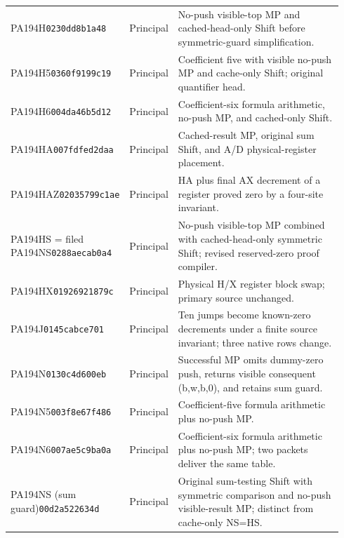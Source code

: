 {\begin{longtable}{@{}p{0.23\linewidth}p{0.13\linewidth}p{0.58\linewidth}@{}}
PA194H\newline\texttt{0230dd8b1a48} & Principal & No-push visible-top MP and cached-head-only Shift before symmetric-guard simplification.\\[2.5pt]
PA194H5\newline\texttt{0360f9199c19} & Principal & Coefficient five with visible no-push MP and cache-only Shift; original quantifier head.\\[2.5pt]
PA194H6\newline\texttt{004da46b5d12} & Principal & Coefficient-six formula arithmetic, no-push MP, and cached-only Shift.\\[2.5pt]
PA194HA\newline\texttt{007fdfed2daa} & Principal & Cached-result MP, original sum Shift, and A/D physical-register placement.\\[2.5pt]
PA194HAZ\newline\texttt{02035799c1ae} & Principal & HA plus final AX decrement of a register proved zero by a four-site invariant.\\[2.5pt]
PA194HS = filed PA194NS\newline\texttt{0288aecab0a4} & Principal & No-push visible-top MP combined with cached-head-only symmetric Shift; revised reserved-zero proof compiler.\\[2.5pt]
PA194HX\newline\texttt{01926921879c} & Principal & Physical H/X register block swap; primary source unchanged.\\[2.5pt]
PA194J\newline\texttt{0145cabce701} & Principal & Ten jumps become known-zero decrements under a finite source invariant; three native rows change.\\[2.5pt]
PA194N\newline\texttt{0130c4d600eb} & Principal & Successful MP omits dummy-zero push, returns visible consequent (b,w,b,0), and retains sum guard.\\[2.5pt]
PA194N5\newline\texttt{003f8e67f486} & Principal & Coefficient-five formula arithmetic plus no-push MP.\\[2.5pt]
PA194N6\newline\texttt{007ae5c9ba0a} & Principal & Coefficient-six formula arithmetic plus no-push MP; two packets deliver the same table.\\[2.5pt]
PA194NS (sum guard)\newline\texttt{00d2a522634d} & Principal & Original sum-testing Shift with symmetric comparison and no-push visible-result MP; distinct from cache-only NS=HS.\\[2.5pt]

\end{longtable}}
